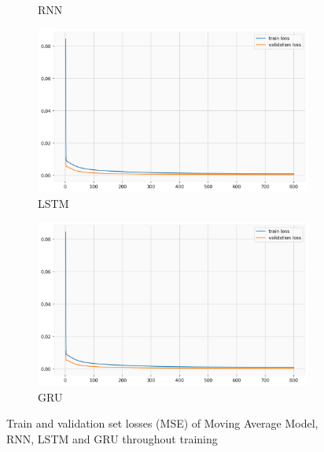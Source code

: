 \documentclass[utf8x]{ctexart}
\begin{document}
\begin{figure}[htb]
\begin{subfigure}[b]{0.48\textwidth}
    \caption{RNN}
    \label{fig:rnn_loss}
  \end{subfigure}
  \begin{subfigure}[b]{0.48\textwidth}
    \centering
    \includegraphics[width=\textwidth]{../images/lstm_losses.png}
    \caption{LSTM}
    \label{fig:lstm_loss}
  \end{subfigure}
  \begin{subfigure}[b]{0.48\textwidth}
    \centering
    \includegraphics[width=\textwidth]{../images/gru_losses.png}
    \caption{GRU}
    \label{fig:gru_loss}
  \end{subfigure}
  \caption{Train and validation set losses (MSE) of Moving Average Model, RNN, LSTM and GRU throughout training}
  \label{fig:losses}
\end{figure}
\end{document}
